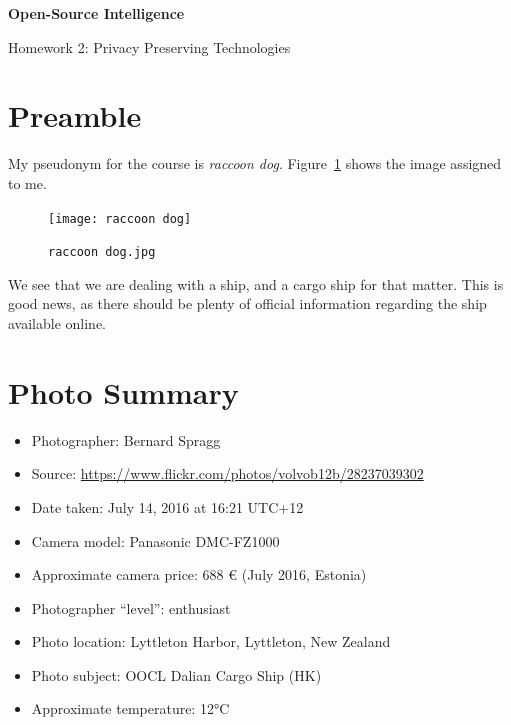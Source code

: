 \documentclass[parskip=half]{scrartcl}
\newcommand\figref{Figure~\ref}
\begin{document}


\begin{center}
    \Large
    \textsf{\textbf{Open-Source Intelligence}}
        
    \vspace{0.4cm}
    \large
    Homework 2: Privacy Preserving Technologies
        
    \vspace{0.4cm}
    \docauthor{}
       
    \vspace{0.9cm}
\end{center}

\tableofcontents

\section{Preamble}

My pseudonym for the course is \textit{raccoon dog}. \figref{fig:og_img} shows
the image assigned to me.

\begin{figure}[h]
\texttt{[image: raccoon dog]}
\centering
\caption{\texttt{raccoon dog.jpg}}
\label{fig:og_img}
\end{figure}

We see that we are dealing with a ship, and a cargo ship for that matter. This
is good news, as there should be plenty of official information regarding the
ship available online.

\section{Photo Summary}

\begin{itemize}
    \item Photographer: Bernard Spragg
    \item Source: \url{https://www.flickr.com/photos/volvob12b/28237039302}
    \item Date taken: July 14, 2016 at 16:21 UTC+12
    \item Camera model: Panasonic DMC-FZ1000
    \item Approximate camera price: 688 € (July 2016, Estonia)
    \item Photographer ``level'': enthusiast
    \item Photo location: Lyttleton Harbor, Lyttleton, New Zealand
    \item Photo subject: OOCL Dalian Cargo Ship (HK)
    \item Approximate temperature: 12°C
\end{itemize}
\end{document}
